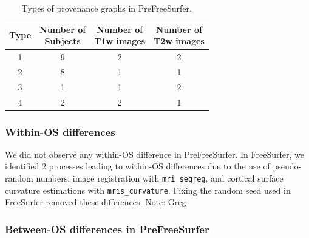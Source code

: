 \documentclass[a4paper,num-refs]{oup-contemporary}
\newcommand{\note}[2]{\color{blue}Note: #1\color{black}}
\begin{document}
\begin{table}[b]
  \centering
  \begin{threeparttable}
  \caption{Types of provenance graphs in PreFreeSurfer.}
  \label{table:data-clusters}
  \begin{tabular}{cc|cc}
  \toprule
  Type   &   \makecell{Number of \\ Subjects}   &  \makecell{Number of \\ T1w images}          & \makecell{Number of \\ T2w images}   \\ \midrule
  1      &               9                      &  2 & 2 \\
  2      &               8                      &  1 & 1 \\
  3      &               1                      &  1 & 2 \\
  4      &               2                      &  2 & 1\\
  \bottomrule
  \end{tabular}
  \end{threeparttable}
  \end{table}

\subsubsection{Within-OS differences}

We did not observe any within-OS difference in PreFreeSurfer. In
FreeSurfer, we identified 2 processes leading to within-OS differences due
to the use of pseudo-random numbers: image registration with
\texttt{mri\_segreg}, and cortical surface curvature estimations with
\texttt{mris\_curvature}. Fixing the random seed used in FreeSurfer removed
these differences. \note{Greg}{can you make some statement on the magnitude of these differences?} 

\subsubsection{Between-OS differences in PreFreeSurfer}
\end{document}
